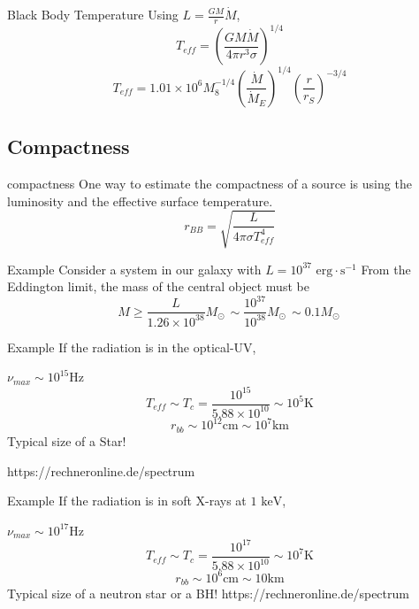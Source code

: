 \documentclass{beamer}
\begin{document}
\begin{frame}{Black Body Temperature}	
	Using $L = \frac{GM}{r} \dot{M}$,
	\pause	
	\[ T_{eff} = \left( \frac{GM\dot{M}}{4\pi r^3 \sigma} \right)^{1/4} \]
	\pause
	\[T_{eff} = 1.01 \times 10^6 M_8^{-1/4} \left( \frac{\dot{M}}{\dot{M}_E} \right)^{1/4} \left( \frac{r}{r_S} \right)^{-3/4} \]
\end{frame}

\subsection{Compactness}
\begin{frame}{compactness}	
	One way to estimate the compactness of a source is using the luminosity and the effective surface temperature.
	\[r_{BB} = \sqrt{\frac{L}{4\pi \sigma T_{eff} ^4}}  \]
\end{frame}


\begin{frame}{Example}	
	Consider a system in our galaxy with $L=10^{37} \textrm{ erg} \cdot \textrm{s}^{-1}$
	\pause
	\bigskip
	From the Eddington limit, the mass of the central object must be
	\[ M \geq \frac{L}{1.26 \times 10^{38}} M_{\odot\ } \sim \frac{10^{37}}{10^{38}} M_{\odot\ }  \sim 0.1 M_{\odot\ } \]
\end{frame}

\begin{frame}{Example}	
	If the radiation is in the optical-UV,\\
	\onslide<2->
	
	$\nu_{max} \sim 10^{15} \textrm{Hz}$
	\onslide<3->
	\[ T_{eff} \sim T_c = \frac{10^{15}}{5.88 \times 10^{10}} \sim 10^5 \textrm{K} \]
	\onslide<4->
	\[ r_{bb} \sim 10^{12} \textrm{cm} \sim 10^{7} \textrm{km}\]
	\onslide<5->
	Typical size of a Star!
	
	\tiny
	https://rechneronline.de/spectrum
\end{frame}

\begin{frame}{Example}	
	If the radiation is in soft X-rays at $1 \textrm{ keV}$,\\
	\onslide<2->
	
	$\nu_{max} \sim 10^{17} \textrm{Hz}$
	\onslide<3->
	\[ T_{eff} \sim T_c = \frac{10^{17}}{5.88 \times 10^{10}} \sim 10^7 \textrm{K} \]
	\onslide<4->
	\[ r_{bb} \sim 10^{6} \textrm{cm} \sim 10 \textrm{km}\]
	\onslide<5->
	Typical size of a neutron star or a BH!
	\onslide<1->
	\tiny
	https://rechneronline.de/spectrum
\end{frame}
\end{document}
